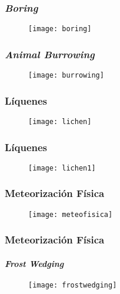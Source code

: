 \documentclass{beamer}
\begin{document}
\begin{frame}
\frametitle{\emph{Boring}}
\begin{figure}
\begin{center}
   	\texttt{[image: boring]}
\end{center}
\end{figure}
\end{frame}
\begin{frame}
\frametitle{\emph{Animal Burrowing}}
\begin{figure}
\begin{center}
   	\texttt{[image: burrowing]}
\end{center}
\end{figure}
\end{frame}
\begin{frame}
\frametitle{Líquenes}
\begin{figure}
\begin{center}
   	\texttt{[image: lichen]}
\end{center}
\end{figure}
\end{frame}
\begin{frame}
\frametitle{Líquenes}
\begin{figure}
\begin{center}
   	\texttt{[image: lichen1]}
\end{center}
\end{figure}
\end{frame}
\begin{frame}
\frametitle{Meteorización Física}
\begin{figure}
\begin{center}
   	\texttt{[image: meteofisica]}
\end{center}
\end{figure}
\end{frame}
\begin{frame}
\frametitle{Meteorización Física}
\framesubtitle{\emph{Frost Wedging}}
\begin{figure}
\begin{center}
   	\texttt{[image: frostwedging]}
\end{center}
\end{figure}
\end{frame}
\end{document}
